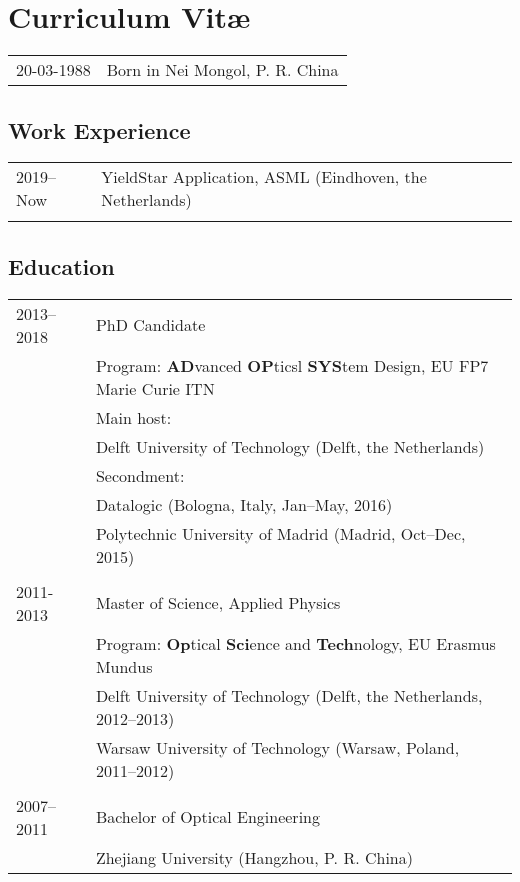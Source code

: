 \chapter*{Curriculum Vit\ae}

\makeatletter
\authors{\@firstname\ {\titleshape\@lastname}}
\makeatother

\noindent
\begin{tabular}{p{}l}
    20-03-1988 & Born in Nei Mongol, P. R. China 
\end{tabular}

\section*{Work Experience}
\begin{tabular}{p{}l}
    2019--Now & YieldStar Application, ASML (Eindhoven, the Netherlands) \\

    \\
\end{tabular}

\section*{Education}
\begin{tabular}{p{}l}

    2013--2018 & PhD Candidate \\
    & Program: \textbf{AD}vanced \textbf{OP}ticsl \textbf{SYS}tem Design, EU FP7 Marie Curie ITN\\
    & Main host:\\ 
    & \;Delft University of Technology (Delft, the Netherlands)\\
    & Secondment:\\ 
    & \;\;Datalogic (Bologna, Italy, Jan--May, 2016)\\
    & \;\;Polytechnic University of Madrid (Madrid, Oct--Dec, 2015)\\
    \\
    2011-2013 & Master of Science, Applied Physics \\
    & Program: \textbf{Op}tical \textbf{Sci}ence and \textbf{Tech}nology, EU Erasmus Mundus\\
    & \;\;Delft University of Technology (Delft, the Netherlands, 2012--2013)\\
    &\;\;Warsaw University of Technology (Warsaw, Poland, 2011--2012)\\
    \\
    2007--2011 & Bachelor of Optical Engineering\\
    & Zhejiang University (Hangzhou, P. R. China)
    
\end{tabular}
    
